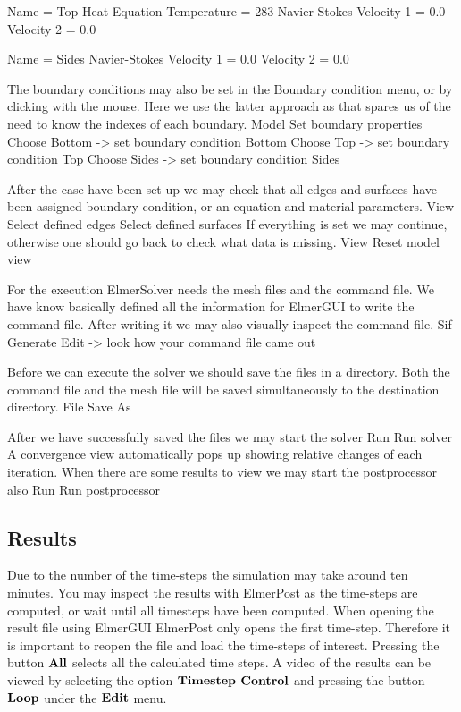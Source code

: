     Name = Top
    Heat Equation
      Temperature = 283
    Navier-Stokes 
      Velocity 1 = 0.0
      Velocity 2 = 0.0
 
    Name = Sides
    Navier-Stokes 
      Velocity 1 = 0.0
      Velocity 2 = 0.0
\ttend   

The boundary conditions may also be set in the Boundary condition menu, or 
by clicking with the mouse. Here we use the latter approach as that spares us of the 
need to know the indexes of each boundary.
\ttbegin
Model
  Set boundary properties
    Choose Bottom -> set boundary condition Bottom
    Choose Top -> set boundary condition Top
    Choose Sides -> set boundary condition Sides
\ttend

After the case have been set-up we may check that all edges and surfaces have been assigned 
boundary condition, or an equation and material parameters.
\ttbegin
View
  Select defined edges 
  Select defined surfaces
\ttend 
If everything is set we may continue, otherwise one should go back to check what data is missing.
\ttbegin
View
  Reset model view
\ttend

For the execution 
ElmerSolver needs the mesh files and the command file. We have know basically defined
all the information for ElmerGUI to write the command file. After writing it we may also visually 
inspect the command file.
\ttbegin
Sif 
  Generate
  Edit -> look how your command file came out  
\ttend

Before we can execute the solver we should save the files in a directory. Both the command file and
the mesh file will be saved simultaneously to the destination directory.
\ttbegin
File 
  Save As
\ttend

After we have successfully saved the files we may start the solver
\ttbegin
Run
  Run solver
\ttend
A convergence view automatically pops up showing relative changes of each iteration.
When there are some results to view we may start the postprocessor also
\ttbegin
Run
  Run postprocessor
\ttend


\subsection*{Results}

Due to the number of the time-steps the simulation may take around ten minutes.
You may inspect the results with ElmerPost as the time-steps are computed, or
wait until all timesteps have been computed. 
When opening the result file using ElmerGUI ElmerPost only opens the first time-step.
Therefore it is important to reopen the file and load the time-steps of interest.
Pressing the button $\bf{All}$ selects all the calculated time steps.
A video of the results can be viewed by selecting the option $\bf{Timestep}$ 
$\bf{Control}$ and pressing the button $\bf{Loop}$ under the $\bf{Edit}$ menu.

